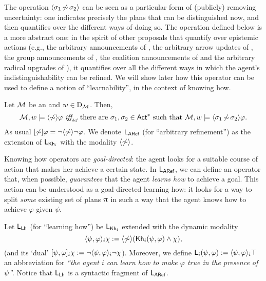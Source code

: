 The operation $\langle \sigma_1{\,\not\sim\,}\sigma_2 \rangle$ can be seen as a particular form of (publicly) removing uncertainty: one indicates precisely the plans that can be distinguished now, and then quantifies over the different ways of doing so. The operation defined below is a more abstract one: in the spirit of other proposals that quantify over epistemic actions (e.g., the arbitrary announcements of \cite{BalbianiBDHHL08}, the arbitrary arrow updates of \cite{DitmarschHKK17}, the group announcements of \cite{GroupAJ}, the coalition announcements of \cite{AgotnesD08} and the arbitrary radical upgrades of \cite{FI24}), it quantifies over all the different ways in which the agent's indistinguishability can be refined. We will show later how this operator can be used to define a notion of ``learnability'', in the context of knowing how.

\medskip

\begin{definition}\label{def:sem:aref}
Let $\mathcal{M}$ be an \ults and $w\in\operatorname{D}_{\mathcal{M}}$.  %
Then,
\[
\modults,w\models\arefdiam\varphi\ \iffdef \ \text{there are } \plan_1,\plan_2 \in \ACT^* \text{ such that } 
\modults,w \models \refdiam{\plan_1}{\plan_2}\varphi.
\]
As usual $[\not\sim]\varphi = \neg\langle \not\sim \rangle\neg\varphi$. We denote $\mathsf{L_{ARef}}$ (for ``arbitrary refinement'') as the extension of $\mathsf{L}_{{\sf Kh}_i}$ with the modality $\langle \not\sim \rangle$.
\end{definition}

\medskip

Knowing how operators are \emph{goal-directed}: the agent looks for a suitable course of action that makes her achieve a certain state. 
In $\mathsf{L_{ARef}}$, we can define an operator that, when possible, \emph{guarantees} that the agent \emph{learns how} to achieve a goal.
This action can be understood as a goal-directed learning how: it looks for a way to split \emph{some} existing set of plans $\uppi$ in such a way that the agent knows how to achieve $\varphi$ given $\psi$.  


Let $\mathsf{L_{Lh}}$ (for ``learning how'') be $\mathsf{L}_{{\sf Kh}_i}$ extended with the dynamic modality
\[
\langle \psi,\varphi \rangle_i\chi := \langle \not\sim \rangle({\sf Kh}_i(\psi,\varphi) \wedge\chi),
\]
(and its `dual' $[\psi,\varphi]_i\chi := \neg\langle \psi,\varphi \rangle_i\neg\chi$).
Moreover, we define ${\sf L}_i(\psi,\varphi) := \langle \psi,\varphi \rangle_i\top$ an abbreviation for \emph{``the agent $i$ can learn how to make $\varphi$ true in the presence of $\psi$''}.
Notice that $\mathsf{L_{Lh}}$ is a syntactic fragment of $\mathsf{L_{ARef}}$.

